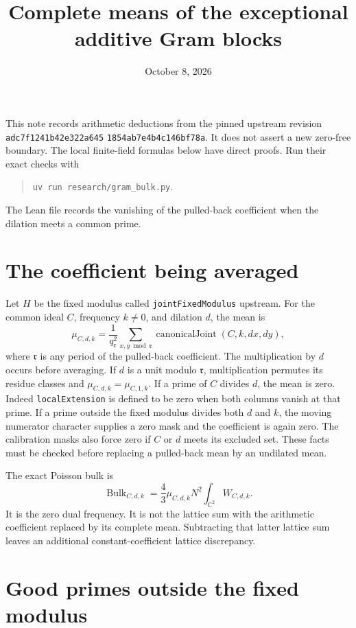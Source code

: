 \documentclass{article}
\newcommand{\C}{\mathbb C}
\begin{document}
\title{Complete means of the exceptional additive Gram blocks}
\author{}
\date{October 8, 2026}
\maketitle

This note records arithmetic deductions from the pinned upstream revision
\texttt{adc7f1241}\allowbreak\texttt{b42e322a645}\allowbreak
\texttt{1854ab7e4b4c}\allowbreak\texttt{146bf78a}.
It does not assert a new zero-free boundary.
The local finite-field formulas below have direct proofs.
Run their exact checks with
\begin{quote}
\texttt{uv run research/gram\_bulk.py}.
\end{quote}
The Lean file  records the vanishing
of the pulled-back coefficient when the dilation meets a common prime.

\section*{The coefficient being averaged}

Let $H$ be the fixed modulus called \texttt{jointFixedModulus} upstream.
For the common ideal $C$, frequency $k\ne0$, and dilation $d$, the mean is
\[
 \mu_{C,d,k}=\frac1{q_{\mathfrak r}^2}
 \sum_{x,y\bmod\mathfrak r}
 \operatorname{canonicalJoint}(C,k,dx,dy),
\]
where $\mathfrak r$ is any period of the pulled-back coefficient.
The multiplication by $d$ occurs before averaging.
If $d$ is a unit modulo $\mathfrak r$, multiplication permutes its residue
classes and $\mu_{C,d,k}=\mu_{C,1,k}$.
If a prime of $C$ divides $d$, the mean is zero.
Indeed \texttt{localExtension} is defined to be zero when both columns vanish
at that prime.
If a prime outside the fixed modulus divides both $d$ and $k$, the moving
numerator character supplies a zero mask and the coefficient is again zero.
The calibration masks also force zero if $C$ or $d$ meets its excluded set.
These facts must be checked before replacing a pulled-back mean by an
undilated mean.

The exact Poisson bulk is
\[
 \operatorname{Bulk}_{C,d,k}
 =\frac43\mu_{C,d,k}N^2\int_{\C^2}W_{C,d,k}.
\]
It is the zero dual frequency.
It is not the lattice sum with the arithmetic coefficient replaced by its
complete mean.
Subtracting that latter lattice sum leaves an additional constant-coefficient
lattice discrepancy.

\section*{Good primes outside the fixed modulus}
\end{document}
